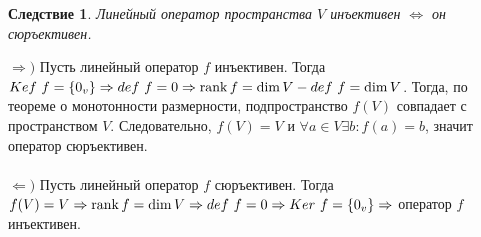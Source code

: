 \newtheorem*{cor11_4_1}{Следствие}\begin{cor11_4_1}Линейный оператор пространства $V$ инъективен $\Longleftrightarrow$ он сюръективен.
\end{cor11_4_1}\begin{Proof}
	$\Rightarrow)$ Пусть линейный оператор $f$ инъективен. Тогда $Kef\ f = \{0_v\}\Rightarrow def\ f = 0\Rightarrow \operatorname{rank} f = \dim V - def\ f = \dim  V$. Тогда, по теореме о монотонности размерности, подпространство $f(V)$ совпадает с пространством $V$. Следовательно, $f(V) = V$ и $\forall a \in V \exists b : f(a) = b$, значит оператор сюръективен.\\\\
	$\Leftarrow)$ Пусть линейный оператор $f$ сюръективен. Тогда $f(V) = V\Rightarrow \operatorname{rank}  f = \dim  V \Rightarrow def\ f = 0\Rightarrow Ker\ f =\{0_v\} \Rightarrow$ оператор $f$ инъективен.
\end{Proof}












